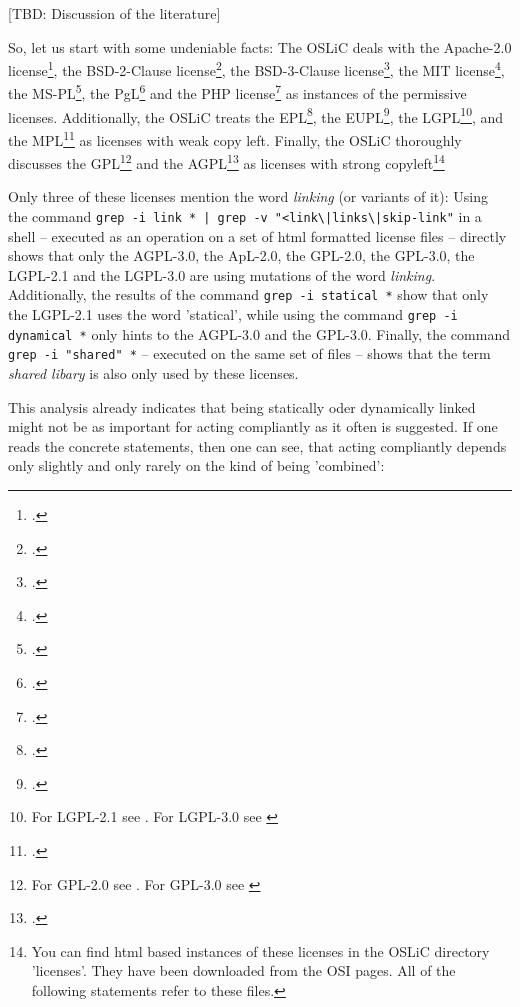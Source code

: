 [TBD: Discussion of the literature]

So, let us start with some undeniable facts: The OSLiC deals with the Apache-2.0
license\footcite [cf.][\nopage wp]{Apl20OsiLicense2004a}, the BSD-2-Clause
license\footcite [cf.][\nopage wp]{BsdLicense2Clause}, the BSD-3-Clause
license\footcite [cf.][\nopage wp]{BsdLicense3Clause}, the MIT license\footcite
[cf.][\nopage wp]{MitLicense2012a}, the MS-PL\footcite[cf.][\nopage
wp]{MsplOsiLicense2013a}, the PgL\footcite[cf.][\nopage wp]{PglOsiLicense2013a}
and the PHP license\footcite[cf.][\nopage wp]{Php30OsiLicense2013a} as instances
of the permissive licenses.
Additionally, the OSLiC treats the EPL\footcite[cf.][\nopage
wp]{Epl10OsiLicense2005a}, the EUPL\footcite[cf.][\nopage
wp]{Eupl11OsiLicense2007a}, the LGPL\footnote{For LGPL-2.1 see \cite
[cf.][\nopage wp]{Lgpl21OsiLicense1999a}. For LGPL-3.0 see \cite [cf.][\nopage
wp]{Lgpl30OsiLicense2007a} }, and the MPL\footcite [cf.][\nopage
wp]{Mpl20OsiLicense2013a} as licenses with weak copy left. Finally, the OSLiC
thoroughly discusses the GPL\footnote{For GPL-2.0 see \cite [cf.][\nopage
wp]{Gpl20OsiLicense1991a}. For GPL-3.0 see \cite [cf.][\nopage
wp]{Gpl30OsiLicense2007a} } and the AGPL\footcite[cf.][\nopage
wp]{Agpl30OsiLicense2007a} as licenses with strong copyleft\footnote{You can
find html based instances of these licenses in the OSLiC directory 'licenses'.
They have been downloaded from the OSI pages. All of the following statements
refer to these files.}

Only three of these licenses mention the word \emph{linking} (or variants of
it): Using the command \texttt{grep -i link * | grep -v
"<link\textbackslash{}|links\textbackslash{}|skip-link"} in a shell -- executed
as an operation on a set of html formatted license files -- directly shows that
only the AGPL-3.0, the ApL-2.0, the GPL-2.0, the GPL-3.0, the LGPL-2.1 and the
LGPL-3.0 are using mutations of the word \emph{linking}. Additionally, the
results of the command \texttt{grep -i statical *} show that only the LGPL-2.1
uses the word 'statical', while using the command \texttt{grep -i dynamical *}
only hints to the AGPL-3.0 and the GPL-3.0. Finally, the command \texttt{grep -i
"shared" *} -- executed on the same set of files -- shows that the term
\emph{shared libary} is also only used by these licenses.

This analysis already indicates that being statically oder dynamically linked
might not be as important for acting compliantly as it often is suggested.
% 
If one reads the concrete statements, then one can see, that acting compliantly
depends only slightly and only rarely on the kind of being 'combined':

